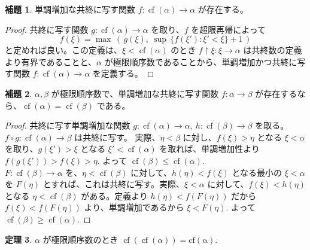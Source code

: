 \documentclass{jsarticle}
\theoremstyle{definition}
\newtheorem{theorem}{定理}[section]
\newtheorem{lemma}[theorem]{補題}
\begin{document}
    \begin{lemma}
        単調増加な共終に写す関数 $f : \operatorname{cf}(\alpha) \rightarrow \alpha$ が存在する。
    \end{lemma}
    \begin{proof}
        共終に写す関数 $g : \operatorname{cf}(\alpha) \rightarrow \alpha$ を取り、$f$ を超限再帰によって
        $$f(\xi) = \max\,(\,g(\xi), \ \sup \, \{f(\xi') : \xi' < \xi\} + 1\,)$$
        と定めれば良い。この定義は、$\xi < \operatorname{cf}(\alpha)$ のとき $f\restriction\xi : \xi \rightarrow \alpha$ は共終数の定義より有界であることと、$\alpha$ が極限順序数であることから、単調増加かつ共終に写す関数 $f : \operatorname{cf}(\alpha) \rightarrow \alpha$ を定義する。
    \end{proof}
    \begin{lemma} \label{cf_eq_cf}
        $\alpha, \beta$ が極限順序数で、単調増加な共終に写す関数 $f : \alpha \rightarrow \beta$ が存在するなら、$\operatorname{cf}(\alpha) = \operatorname{cf}(\beta)$ である。
    \end{lemma}
    \begin{proof}
        共終に写す単調増加な関数 $g : \operatorname{cf}(\alpha) \rightarrow \alpha, \ h : \operatorname{cf}(\beta) \rightarrow \beta$ を取る。\\
        $f\circ g : \operatorname{cf}(\alpha) \rightarrow \beta$ は共終に写す。
        実際、$\eta < \beta$ に対し、$f(\xi) > \eta$ となる $\xi < \alpha$ を取り、$g(\xi') > \xi$ となる $\xi' < \operatorname{cf}(\alpha)$ を取れば、単調増加性より $f(g(\xi')) > f(\xi) > \eta.$ よって $\operatorname{cf}(\beta) \leq \operatorname{cf}(\alpha).$\\
        $F : \operatorname{cf}(\beta) \rightarrow \alpha$ を、$\eta < \operatorname{cf}(\beta)$ に対して、$h(\eta) < f(\xi)$ となる最小の $\xi < \alpha$ を $F(\eta)$ とすれば、これは共終に写す。実際、$\xi < \alpha$ に対して、$f(\xi) < h(\eta)$ となる $\eta < \operatorname{cf}(\beta)$ がある。定義より $h(\eta) < f(F(\eta))$ だから $f(\xi) < f(F(\eta))$ より、単調増加であるから $\xi < F(\eta).$ よって $\operatorname{cf}(\beta) \geq \operatorname{cf}(\alpha).$
    \end{proof}

    \begin{theorem}
        $\alpha$ が極限順序数のとき $\operatorname{cf}(\operatorname{cf}(\alpha)) = \operatorname{cf(\alpha)}.$
    \end{theorem}
    
\end{document}
